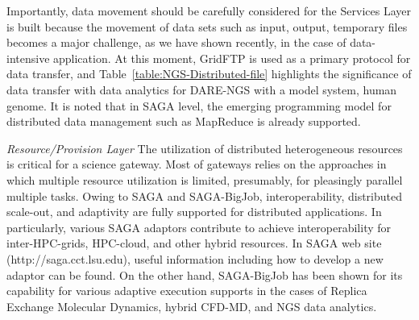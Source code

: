 \documentclass{sig-alternate}
\begin{document}
Importantly, data movement should be carefully considered for the Services Layer is built because the movement of data sets such as input, output, temporary files becomes a major challenge, as we have shown recently, in the case of data-intensive application\cite{ecmls11}. At this moment, GridFTP is used as a primary protocol for data transfer, and Table~\ref{table:NGS-Distributed-file} highlights the significance of data transfer with data analytics for DARE-NGS with a model system, human genome.  It is noted that in SAGA level, the emerging programming model for distributed data management such as MapReduce is already supported.

%

\textit{Resource/Provision Layer}
The utilization of distributed heterogeneous resources is critical for a science gateway.  Most of gateways relies on the approaches in which multiple resource utilization is limited, presumably, for pleasingly parallel multiple tasks.  Owing to SAGA and SAGA-BigJob, interoperability, distributed scale-out, and adaptivity are fully supported for distributed applications.  In particularly, various SAGA adaptors contribute to achieve interoperability for inter-HPC-grids, HPC-cloud, and other hybrid resources.  In SAGA web site (http://saga.cct.lsu.edu), useful information including how to develop a new adaptor can be found.  On the other hand, SAGA-BigJob has been shown for its capability for various adaptive execution supports in the cases of Replica Exchange Molecular Dynamics, hybrid CFD-MD, and NGS data analytics.    
\end{document}
